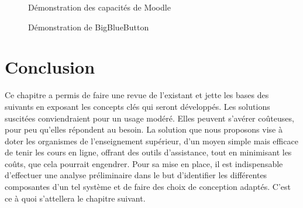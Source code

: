 \begin{figure}[H]
  \centering
  \caption{Démonstration des capacités de Moodle}
  \label{fig:moodle_demo}
\end{figure}

\begin{figure}[H]
  \centering
  \caption{Démonstration de BigBlueButton}
  \label{fig:bbg_demo}
\end{figure}

\section*{Conclusion}
Ce chapitre a permis de faire une revue de l’existant et jette les bases des 
suivants en exposant les concepts clés qui seront développés. 
Les solutions suscitées conviendraient pour un usage modéré. 
Elles peuvent s'avérer coûteuses, pour peu qu’elles répondent au besoin. 
La solution que nous proposons vise à doter les organismes de l’enseignement supérieur, 
d’un moyen simple mais efficace de tenir les cours en ligne, offrant des outils d’assistance, 
tout en minimisant les coûts, que cela pourrait engendrer. Pour sa mise en place, il est indispensable
d'effectuer une analyse préliminaire dans le but d'identifier les différentes composantes d'un tel 
système et de faire des choix de conception adaptés. C'est ce à quoi s'attellera le chapitre suivant.

